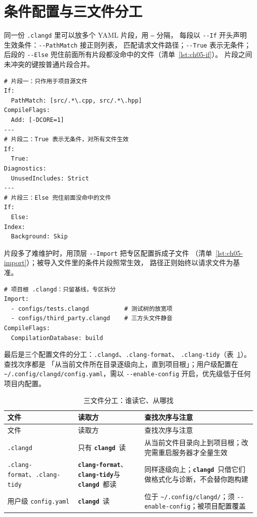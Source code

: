 \documentclass[12pt,a4paper,fontset=fandol]{ctexbook}
\newcommand{\Opt}[1]{\texttt{-\/-#1}}
\newcommand{\Lib}[1]{\textbf{\texttt{#1}}}
\newcommand{\Tidy}{\Lib{clang-tidy}}
\newcommand{\Fmt}{\Lib{clang-format}}
\newcommand{\CD}{\Lib{clangd}}
\begin{document}
\section{条件配置与三文件分工}\label{sec:ch05-s3}

同一份 \texttt{.clangd} 里可以放多个 YAML 片段，用 \texttt{---} 分隔，
每段以 \Opt{If} 开头声明生效条件：\Opt{PathMatch} 接正则列表，
匹配请求文件路径；\Opt{True} 表示无条件；后段的 \Opt{Else}
兜住前面所有片段都没命中的文件（清单~\ref{lst:ch05-if}）。
片段之间未冲突的键按普通片段合并。

\begin{lstlisting}[style=yamlstyle,caption={按路径分区：If 条件片段与 Else 兜底},label={lst:ch05-if}]
# 片段一：只作用于项目源文件
If:
  PathMatch: [src/.*\.cpp, src/.*\.hpp]
CompileFlags:
  Add: [-DCORE=1]
---
# 片段二：True 表示无条件，对所有文件生效
If:
  True:
Diagnostics:
  UnusedIncludes: Strict
---
# 片段三：Else 兜住前面没命中的文件
If:
  Else:
Index:
  Background: Skip
\end{lstlisting}

片段多了难维护时，用顶层 \Opt{Import} 把专区配置拆成子文件
（清单~\ref{lst:ch05-import}）；被导入文件里的条件片段照常生效，
路径正则始终以请求文件为基准。

\begin{lstlisting}[style=yamlstyle,caption={Import 拆分专区配置},label={lst:ch05-import}]
# 项目根 .clangd：只留基线，专区拆分
Import:
  - configs/tests.clangd          # 测试树的放宽项
  - configs/third_party.clangd    # 三方头文件静音
CompileFlags:
  CompilationDatabase: build
\end{lstlisting}

最后是三个配置文件的分工：\texttt{.clangd}、\texttt{.clang-format}、
\texttt{.clang-tidy}（表~\ref{tab:ch05-files}）。查找次序都是
「从当前文件所在目录逐级向上，直到项目根」；用户级配置在
\texttt{\textasciitilde/.config/clangd/config.yaml}，需以
\Opt{enable-config} 开启，优先级低于任何项目内配置。

\begin{longtable}{>{\raggedright\arraybackslash}p{}
                  >{\raggedright\arraybackslash}p{}
                  >{\raggedright\arraybackslash}p{}}
\caption{三文件分工：谁读它、从哪找}\label{tab:ch05-files}\\
\toprule
文件 & 读取方 & 查找次序与注意 \\
\midrule
\endfirsthead
\toprule
文件 & 读取方 & 查找次序与注意 \\
\midrule
\endhead
\texttt{.clangd} & 只有 \CD\ 读 & 从当前文件目录向上到项目根；改完需重启服务器才全量生效 \\
\midrule
\texttt{.clang-}\hspace{0pt}\texttt{format}、\texttt{.clang-tidy} & \Fmt、\Tidy 与 \CD\ 都读 & 同样逐级向上；\CD\ 只借它们做格式化与诊断，不会替你跑构建 \\
\midrule
用户级 \texttt{config.yaml} & \CD\ 读 & 位于 \texttt{\textasciitilde/.config/}\hspace{0pt}\texttt{clangd/}；须 \Opt{enable-config}；被项目配置覆盖 \\
\bottomrule
\end{longtable}
\end{document}
